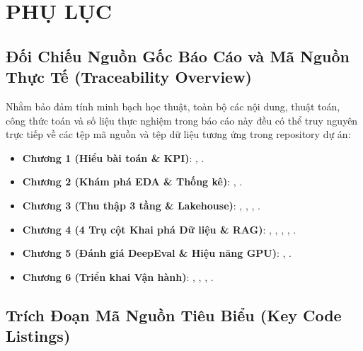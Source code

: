 
\chapter*{PHỤ LỤC}
\renewcommand{\thesection}{\Alph{section}}
\setcounter{section}{0}

\section{Đối Chiếu Nguồn Gốc Báo Cáo và Mã Nguồn Thực Tế (Traceability Overview)}

Nhằm bảo đảm tính minh bạch học thuật, toàn bộ các nội dung, thuật toán, công thức toán và số liệu thực nghiệm trong báo cáo này đều có thể truy nguyên trực tiếp về các tệp mã nguồn và tệp dữ liệu tương ứng trong repository dự án:

\begin{itemize}[leftmargin=1.5cm]
  \item \textbf{Chương 1 (Hiểu bài toán \& KPI)}: , .
  \item \textbf{Chương 2 (Khám phá EDA \& Thống kê)}: , .
  \item \textbf{Chương 3 (Thu thập 3 tầng \& Lakehouse)}: , , , .
  \item \textbf{Chương 4 (4 Trụ cột Khai phá Dữ liệu \& RAG)}: , , , , .
  \item \textbf{Chương 5 (Đánh giá DeepEval \& Hiệu năng GPU)}: , .
  \item \textbf{Chương 6 (Triển khai Vận hành)}: , , , .
\end{itemize}

\section{Trích Đoạn Mã Nguồn Tiêu Biểu (Key Code Listings)}

